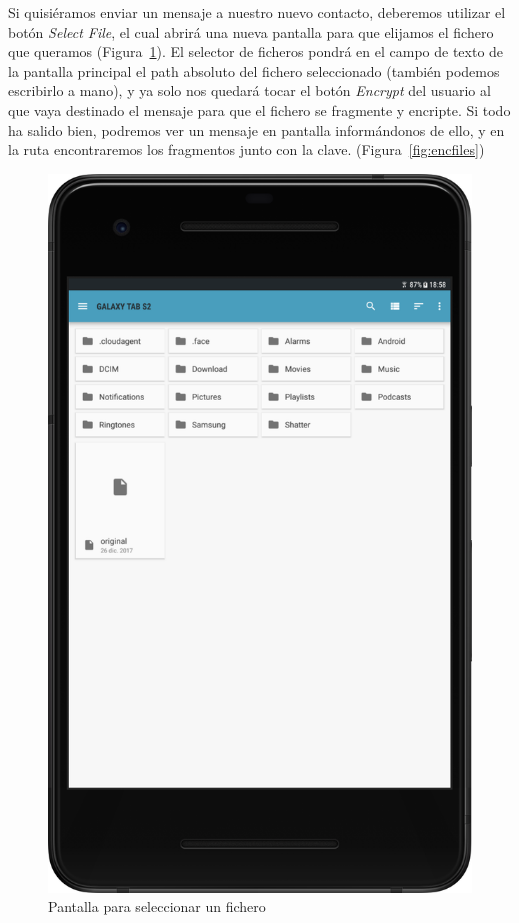 Si quisiéramos enviar un mensaje a nuestro nuevo contacto, deberemos utilizar
el botón \emph{Select File}, el cual abrirá una nueva pantalla para que
elijamos el fichero que queramos (Figura~\ref{fig:file_picker}). El selector de
ficheros pondrá en el campo de texto de la pantalla principal el path absoluto
del fichero seleccionado (también podemos escribirlo a mano), y ya solo nos
quedará tocar el botón \emph{Encrypt} del usuario al que vaya destinado el
mensaje para que el fichero se fragmente y encripte. Si todo ha salido bien,
podremos ver un mensaje en pantalla informándonos de ello, y en la ruta
 encontraremos los fragmentos junto con la clave.
(Figura~\ref{fig:encfiles})

\begin{figure}[ht]
  \centering
  \includegraphics[scale=0.4]{Figures/file_picker}
  \decoRule
  \caption[Shatter (File Picker)]{Pantalla para seleccionar un fichero}
  \label{fig:file_picker}
\end{figure}

